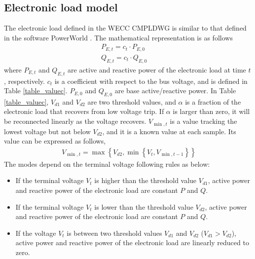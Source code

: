 \documentclass[journal]{IEEEtran}
\begin{document}
	\subsection{Electronic load model}
	The electronic load defined in the WECC CMPLDWG is similar to that defined in the software PowerWorld \cite{Wang2019}. The mathematical representation is as follows
	\begin{subequations}
		\label{Equation.Elec}
		\begin{align}
		&  {P_{E,t}} = {c_t} \cdot {P_{E,0}} \quad\quad \label{Elec1}\\[5pt]  
		&  {Q_{E,t}} = {c_t} \cdot {Q_{E,0}}  \quad\quad \label{Elec2}
		\end{align}
	\end{subequations}
	where $P_{E,t}$ and $Q_{E,t}$ are active and reactive power of the electronic load at time $t$, respectively. $c_t$ is a coefficient with respect to the bus voltage, and is defined in Table \ref{table_valuec}. $P_{E,0}$ and $Q_{E,0}$ are base active/reactive power. In Table \ref{table_valuec}, $V_{d1}$ and $V_{d2}$ are two threshold values, and $\alpha$ is a fraction of the electronic load that recovers from low voltage trip. If $\alpha$ is larger than zero, it will be reconnected linearly as the voltage recovers.  ${V_{\min ,t}}$ is a value tracking the lowest voltage but not below $V_{d2}$, and it is a known value at each sample. Its value can be expressed as follows,
	\begin{eqnarray}
	\label{Equation.VminFor}
	\ {V_{\min ,t}} = \max \left\{ {{V_{d2}},\min \left\{ {{V_t},{V_{\min ,t - 1}}} \right\}} \right\}
	\end{eqnarray} 
	The modes depend on the terminal voltage following rules as below:
	\begin{itemize}
		\item If the terminal voltage $V_{t}$ is higher than the threshold value $V_{d1}$, active power and reactive power of the electronic load are constant $P$ and $Q$.   
		\item If the terminal voltage $V_{t}$ is lower than the threshold value $V_{d2}$, active power and reactive power of the electronic load are constant $P$ and $Q$.   
		\item If the voltage $V_{t}$ is between two threshold values $V_{d1}$ and $V_{d2}$ (${V_{d1}} > {V_{d2}}$), active power and reactive power of the electronic load are linearly reduced to zero.
	\end{itemize}
\end{document}
